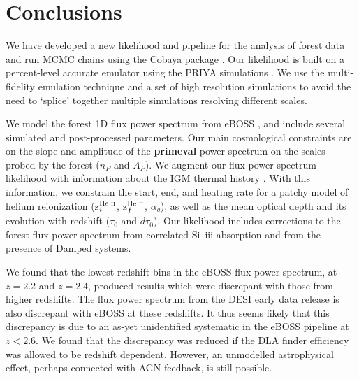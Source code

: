 \section{Conclusions}\label{sec:conclusions}

We have developed a new likelihood and pipeline for the analysis of \Lya forest data and run MCMC chains using the Cobaya package \cite{2021JCAP...05..057T, 2019ascl.soft10019T}.
Our likelihood is built on a percent-level accurate emulator using the PRIYA simulations \cite{2023simsuite}.
We use the multi-fidelity emulation technique \cite{2022MNRAS.517.3200F} and a set of high resolution simulations to avoid the need to `splice' together multiple simulations resolving different scales.

We model the \Lya forest 1D flux power spectrum from eBOSS \cite{2019JCAP...07..017C}, and include several simulated and post-processed parameters.
Our main cosmological constraints are on the slope and amplitude of the \textbf{primeval} power spectrum on the scales probed by the \Lya forest ($n_P$ and $A_P$). 
We augment our \Lya flux power spectrum likelihood with information about the IGM thermal history \cite{2021MNRAS.506.4389G}.
With this information, we constrain the start, end, and heating rate for a patchy model of helium reionization (z$^{\text{He~{\sc ii}}}_i$, z$^{\text{He~{\sc ii}}}_f$, $\alpha_q$), as well as the mean optical depth and its evolution with redshift ($\tau_0$ and $d\tau_0$).
Our likelihood includes corrections to the \lya forest flux power spectrum from correlated Si~{\sc iii} absorption and from the presence of Damped \lya systems.

We found that the lowest redshift bins in the eBOSS flux power spectrum, at $z=2.2$ and $z=2.4$, produced results which were discrepant with those from higher redshifts.
The flux power spectrum from the DESI early data release is also discrepant with eBOSS at these redshifts.
It thus seems likely that this discrepancy is due to an as-yet unidentified systematic in the eBOSS pipeline at $z < 2.6$. We found that the discrepancy was reduced if the DLA finder efficiency was allowed to be redshift dependent. However, an unmodelled astrophysical effect, perhaps connected with AGN feedback, is still possible.  

